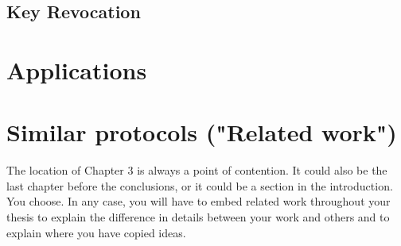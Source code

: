 \subsection{Key Revocation}








\section{Applications}








\section{Similar protocols ("Related work")}

The location of Chapter 3 is always a point of contention. It
could also be the last chapter before the conclusions, or it could
be a section in the introduction. You choose. In any case, you will
have to embed related work throughout your thesis to explain
the difference in details between your work and others and to
explain where you have copied ideas.

